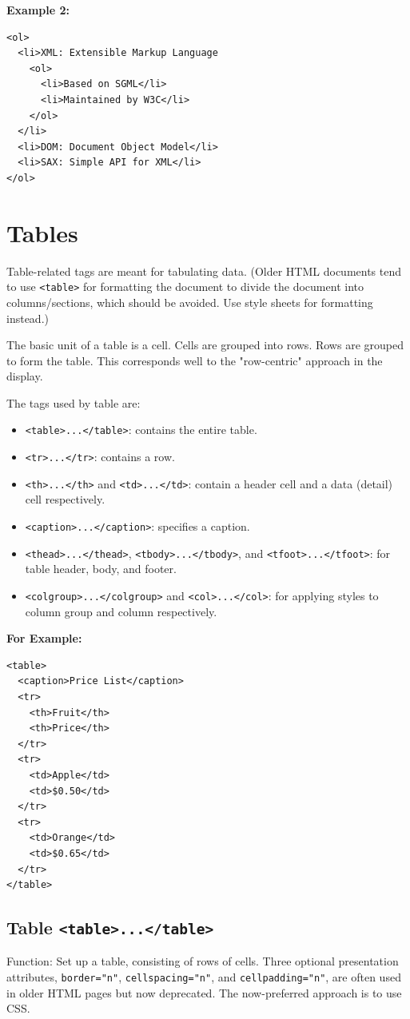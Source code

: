 \documentclass[12pt,a4paper]{article}
\begin{document}
\textbf{Example 2:}
\begin{verbatim}
<ol>
  <li>XML: Extensible Markup Language
    <ol>
      <li>Based on SGML</li>
      <li>Maintained by W3C</li>
    </ol>
  </li>
  <li>DOM: Document Object Model</li>
  <li>SAX: Simple API for XML</li>
</ol>
\end{verbatim}

\section*{Tables}
Table-related tags are meant for tabulating data. (Older HTML documents tend to use \texttt{<table>} for formatting the document to divide the document into columns/sections, which should be avoided. Use style sheets for formatting instead.)

The basic unit of a table is a cell. Cells are grouped into rows. Rows are grouped to form the table. This corresponds well to the "row-centric" approach in the display.

The tags used by table are:
\begin{itemize}
    \item \texttt{<table>...</table>}: contains the entire table.
    \item \texttt{<tr>...</tr>}: contains a row.
    \item \texttt{<th>...</th>} and \texttt{<td>...</td>}: contain a header cell and a data (detail) cell respectively.
    \item \texttt{<caption>...</caption>}: specifies a caption.
    \item \texttt{<thead>...</thead>}, \texttt{<tbody>...</tbody>}, and \texttt{<tfoot>...</tfoot>}: for table header, body, and footer.
    \item \texttt{<colgroup>...</colgroup>} and \texttt{<col>...</col>}: for applying styles to column group and column respectively.
\end{itemize}

\textbf{For Example:}
\begin{verbatim}
<table>
  <caption>Price List</caption>
  <tr>
    <th>Fruit</th>
    <th>Price</th>
  </tr>
  <tr>
    <td>Apple</td>
    <td>$0.50</td>
  </tr>
  <tr>
    <td>Orange</td>
    <td>$0.65</td>
  </tr>
</table>
\end{verbatim}

\subsection*{Table \texttt{<table>...</table>}}
Function: Set up a table, consisting of rows of cells. Three optional presentation attributes, \texttt{border="n"}, \texttt{cellspacing="n"}, and \texttt{cellpadding="n"}, are often used in older HTML pages but now deprecated. The now-preferred approach is to use CSS.
\end{document}
